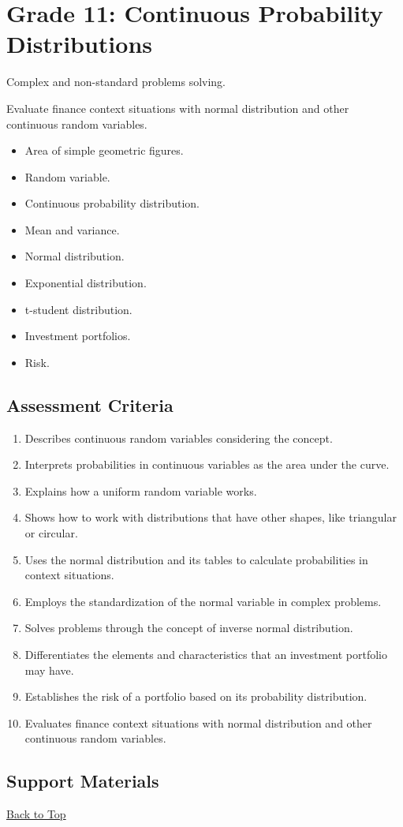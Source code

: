 \section{Grade 11: Continuous Probability Distributions}\label{sec:grade11-term1-overview}

Complex and non-standard problems solving.

Evaluate finance context situations with normal distribution and other continuous random variables.

\begin{itemize}
	\item Area of simple geometric figures.
	\item Random variable.
	\item Continuous probability distribution.
	\item Mean and variance.
	\item Normal distribution.
	\item Exponential distribution.
	\item t-student distribution.
	\item Investment portfolios.
	\item Risk.
\end{itemize}

\subsection{Assessment Criteria}\label{sec:grade11-term1-criteria}

\begin{enumerate}
	\item Describes continuous random variables considering the concept.
	\item Interprets probabilities in continuous variables as the area under the curve.
	\item Explains how a uniform random variable works.
	\item Shows how to work with distributions that have other shapes, like triangular or circular.
	\item Uses the normal distribution and its tables to calculate probabilities in context situations.
	\item Employs the standardization of the normal variable in complex problems.
	\item Solves problems through the concept of inverse normal distribution.
	\item Differentiates the elements and characteristics that an investment portfolio may have.
	\item Establishes the risk of a portfolio based on its probability distribution.
	\item Evaluates finance context situations with normal distribution and other continuous random variables.
\end{enumerate}

\subsection{Support Materials}\label{sec:grade11-term1-support-materials}

\vspace{6pt}
\noindent\hyperref[table-of-contents]{Back to Top}
